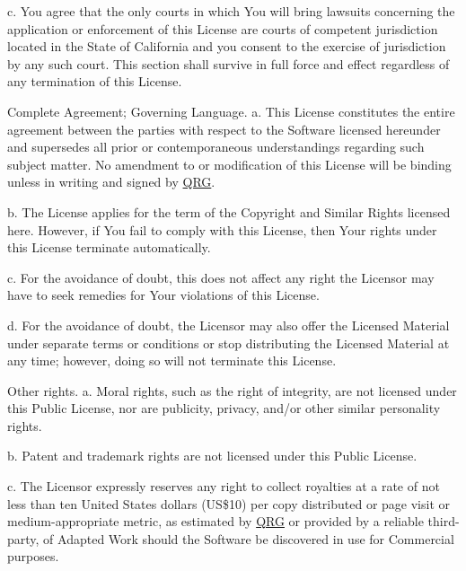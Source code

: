 c. You agree that the only courts in which You will bring lawsuits concerning the application or enforcement of this License are courts of competent jurisdiction located in the State of California and you consent to the exercise of jurisdiction by any such court. This section shall survive in full force and effect regardless of any termination of this License.


\begin{DoxyEnumerate}
\item Complete Agreement; Governing Language. a. This License constitutes the entire agreement between the parties with respect to the Software licensed hereunder and supersedes all prior or contemporaneous understandings regarding such subject matter. No amendment to or modification of this License will be binding unless in writing and signed by \mbox{\hyperlink{namespace_q_r_g}{QRG}}.
\end{DoxyEnumerate}

b. The License applies for the term of the Copyright and Similar Rights licensed here. However, if You fail to comply with this License, then Your rights under this License terminate automatically.

c. For the avoidance of doubt, this does not affect any right the Licensor may have to seek remedies for Your violations of this License.

d. For the avoidance of doubt, the Licensor may also offer the Licensed Material under separate terms or conditions or stop distributing the Licensed Material at any time; however, doing so will not terminate this License.


\begin{DoxyEnumerate}
\item Other rights. a. Moral rights, such as the right of integrity, are not licensed under this Public License, nor are publicity, privacy, and/or other similar personality rights.
\end{DoxyEnumerate}

b. Patent and trademark rights are not licensed under this Public License.

c. The Licensor expressly reserves any right to collect royalties at a rate of not less than ten United States dollars (US\$10) per copy distributed or page visit or medium-\/appropriate metric, as estimated by \mbox{\hyperlink{namespace_q_r_g}{QRG}} or provided by a reliable third-\/party, of Adapted Work should the Software be discovered in use for Commercial purposes. 